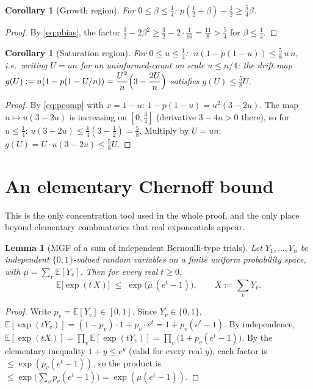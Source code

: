 \documentclass[11pt]{article}
\newtheorem{lemma}[theorem]{Lemma}
\newtheorem{corollary}[theorem]{Corollary}
\newcommand{\E}{\mathbb{E}}
\begin{document}
\begin{corollary}[Growth region]\label{cor:growth}
For $0 \le \beta \le \tfrac14$: $p(\tfrac12+\beta) - \tfrac12 \ge \tfrac54\beta$.
\end{corollary}
\begin{proof}
By \eqref{eq:pbias}, the factor $\tfrac32 - 2\beta^2 \ge \tfrac32 -
2\cdot\tfrac1{16} = \tfrac{11}8 > \tfrac54$ for $\beta \le \tfrac14$.
\end{proof}

\begin{corollary}[Saturation region]\label{cor:saturation}
For $0 \le u \le \tfrac14$: $\;n(1-p(1-u)) \le \tfrac58\, u\,n$, i.e.\
writing $U = un$ for an uninformed-count on scale $u \le n/4$: the drift map
$g(U) := n(1-p(1-U/n)) = \dfrac{U^2}{n}\Bigl(3-\dfrac{2U}{n}\Bigr)$
satisfies $g(U) \le \tfrac58 U$.
\end{corollary}
\begin{proof}
By \eqref{eq:pcomp} with $x=1-u$: $1-p(1-u) = u^2(3-2u)$. The map $u
\mapsto u(3-2u)$ is increasing on $[0,\tfrac34]$ (derivative $3-4u>0$
there), so for $u \le \tfrac14$: $u(3-2u) \le \tfrac14(3-\tfrac12) =
\tfrac58$. Multiply by $U=un$: $g(U) = U\cdot u(3-2u) \le \tfrac58 U$.
\end{proof}

\section{An elementary Chernoff bound}\label{sec:chernoff}

This is the only concentration tool used in the whole proof, and the only
place beyond elementary combinatorics that real exponentials appear.

\begin{lemma}[MGF of a sum of independent Bernoulli-type trials]
\label{lem:mgf}
Let $Y_1,\dots,Y_n$ be independent $\{0,1\}$-valued random variables on a
finite uniform probability space, with $\mu = \sum_v \E[Y_v]$. Then for
every real $t \ge 0$,
\[
  \E\bigl[\exp(t\,X)\bigr] \;\le\; \exp\bigl(\mu\,(e^t-1)\bigr), \qquad
  X := \sum_v Y_v.
\]
\end{lemma}
\begin{proof}
Write $p_v = \E[Y_v] \in [0,1]$. Since $Y_v \in \{0,1\}$,
$\E[\exp(tY_v)] = (1-p_v)\cdot 1 + p_v \cdot e^t = 1 + p_v(e^t-1)$. By
independence, $\E[\exp(tX)] = \prod_v \E[\exp(tY_v)] = \prod_v \bigl(1 +
p_v(e^t-1)\bigr)$. By the elementary inequality $1+y \le e^y$ (valid for
every real $y$), each factor is $\le \exp(p_v(e^t-1))$, so the product is
$\le \exp\bigl(\sum_v p_v (e^t-1)\bigr) = \exp(\mu(e^t-1))$.
\end{proof}
\end{document}
